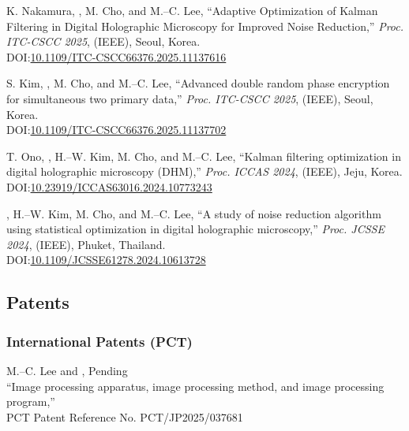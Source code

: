\documentclass[a4paper,9pt]{extarticle}
\begin{document}
\begin{enumerate}[label={[\arabic*]}, start=1]
    \item 
    K. Nakamura, , M. Cho, and M.--C. Lee, 
    ``Adaptive Optimization of Kalman Filtering in Digital Holographic Microscopy for Improved Noise Reduction,'' 
    \textit{Proc. ITC-CSCC 2025}, (IEEE),
    Seoul, Korea. \\
    DOI:\href{https://doi.org/10.1109/ITC-CSCC66376.2025.11137616}{10.1109/ITC-CSCC66376.2025.11137616}
    
    \item 
    S. Kim, , M. Cho, and M.--C. Lee, 
    ``Advanced double random phase encryption for simultaneous two primary data,'' 
    \textit{Proc. ITC-CSCC 2025}, (IEEE),
    Seoul, Korea. \\
    DOI:\href{https://doi.org/10.1109/ITC-CSCC66376.2025.11137702}{10.1109/ITC-CSCC66376.2025.11137702}
    
    \item 
    T. Ono, , H.--W. Kim, M. Cho, and M.--C. Lee, 
    ``Kalman filtering optimization in digital holographic microscopy (DHM),'' 
    \textit{Proc. ICCAS 2024}, (IEEE),
    Jeju, Korea.\\
    DOI:\href{https://doi.org/10.23919/ICCAS63016.2024.10773243}{10.23919/ICCAS63016.2024.10773243} 
    
    
    \item 
    , H.--W. Kim, M. Cho, and M.--C. Lee, 
    ``A study of noise reduction algorithm using statistical optimization in digital holographic microscopy,'' 
    \textit{Proc. JCSSE 2024}, (IEEE),
    Phuket, Thailand.\\
    DOI:\href{https://doi.org/10.1109/JCSSE61278.2024.10613728}{10.1109/JCSSE61278.2024.10613728} 
\end{enumerate} 

\subsection*{Patents}
\subsubsection*{International Patents (PCT)}
\begin{enumerate}[label={[\arabic*]}, start=1]
    \item 
    M.--C. Lee and , \hfill {Pending}  \\%
    ``Image processing apparatus, image processing method, and image processing program,''                         \\
    PCT Patent Reference No. PCT/JP2025/037681 
\end{enumerate}
\end{document}
